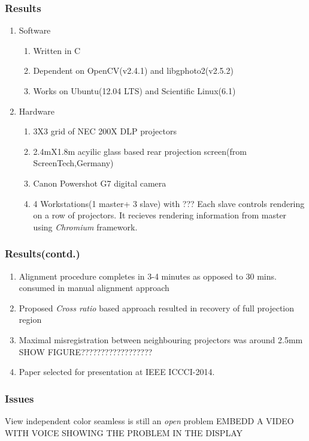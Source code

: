 \documentclass{beamer}
\begin{document}
\begin{frame}
\frametitle{Results}
\begin{enumerate}
\item Software
\begin{enumerate}
\item Written in C
\item Dependent on OpenCV(v2.4.1) and libgphoto2(v2.5.2)
\item Works on Ubuntu(12.04 LTS) and Scientific Linux(6.1)
\end{enumerate}      
\item Hardware
\begin{enumerate}
\item 3X3 grid of NEC 200X DLP projectors
\item 2.4mX1.8m acyilic glass based rear projection screen(from ScreenTech,Germany)
\item Canon Powershot G7 digital camera
\item 4 Workstations(1 master+ 3 slave) with ???\newline
Each slave controls rendering on a row of projectors. It recieves rendering information from master using \textit{Chromium} framework.
\end{enumerate}
\end{enumerate}
\end{frame}

\begin{frame}
\frametitle{Results(contd.)}
\begin{enumerate}
\item Alignment procedure completes in 3-4 minutes as opposed to 30 mins. consumed in manual alignment approach
\item Proposed \textit{Cross ratio} based approach resulted in recovery of full projection region
\item Maximal misregistration between neighbouring projectors was around 2.5mm
SHOW FIGURE??????????????????
\item Paper selected for presentation at IEEE ICCCI-2014.
\end{enumerate}
\end{frame}


\begin{frame}
\frametitle{Issues}
View independent color seamless is still an \textit{open} problem
EMBEDD A VIDEO WITH VOICE SHOWING THE PROBLEM IN THE DISPLAY
\end{frame}
\end{document}
